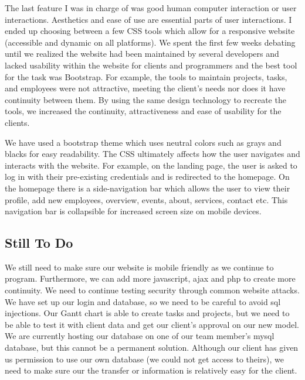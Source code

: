 \documentclass[letterpaper,10pt,titlepage,journal,compsoc,draftclsnofoot,onecolumn]{IEEEtran}
\newcommand\tab[1][1cm]{\hspace*{#1}}
\begin{document}
\tab The last feature I was in charge of was good human computer interaction or user interactions. Aesthetics and ease of use are essential parts of user interactions. I ended up choosing between a few CSS tools which allow for a responsive website (accessible and dynamic on all platforms). We spent the first few weeks debating until we  realized the website had been maintained by several developers and lacked usability within the website for clients and programmers and the best tool for the task was Bootstrap. For example, the tools to maintain projects, tasks, and employees were not attractive, meeting the client's needs nor does it have continuity between them. By using the same design technology to recreate the tools, we increased the continuity, attractiveness and ease of usability for the clients.\newline

\tab We have used a bootstrap theme which uses neutral colors such as grays and blacks for easy readability. The CSS ultimately affects how the user navigates and interacts with the website. For example, on the landing page, the user is asked to log in with their pre-existing credentials and is redirected to the homepage. On the homepage there is a side-navigation bar which allows the user to view their profile, add new employees, overview, events, about, services, contact etc. This navigation bar is collapsible for increased screen size on mobile devices.\newline


\subsection{Still To Do}

\tab 
We still need to make sure our website is mobile friendly as we continue to program. Furthermore, we can add more javascript, ajax and php to create more continuity. We need to continue testing security through common website attacks. We have set up our login and database, so we need to be careful to avoid sql injections. Our Gantt chart is able to create tasks and projects, but we need to be able to test it with client data and get our client’s approval on our new model. We are currently hosting our database on one of our team member’s mysql database, but this cannot be a permanent solution. Although our client has given us permission to use our own database (we could not get access to theirs), we need to make sure our the transfer or information is relatively easy for the client.
\newline
\end{document}
